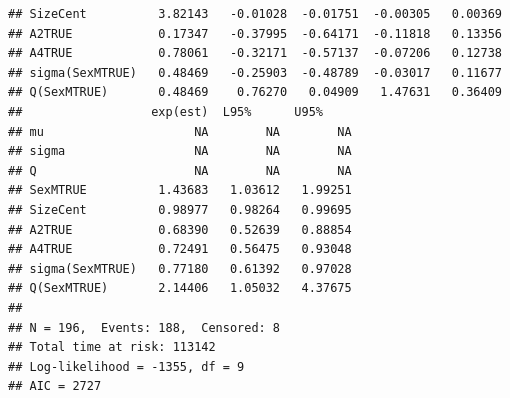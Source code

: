 \documentclass{article}\usepackage[]{graphicx}\usepackage[]{color}
\makeatletter
\newenvironment{kframe}{%
 \def\at@end@of@kframe{}%
 \ifinner\ifhmode%
  \def\at@end@of@kframe{\end{minipage}}%
  \begin{minipage}{\columnwidth}%
 \fi\fi%
 \def\FrameCommand##1{\hskip\@totalleftmargin \hskip-\fboxsep
 \colorbox{shadecolor}{##1}\hskip-\fboxsep
     \hskip-\linewidth \hskip-\@totalleftmargin \hskip\columnwidth}%
 \MakeFramed {\advance\hsize-\width
   \@totalleftmargin\z@ \linewidth\hsize
   \@setminipage}}%
 {\par\unskip\endMakeFramed%
 \at@end@of@kframe}
\newenvironment{knitrout}{}{} %
\makeatother
\begin{document}
\begin{knitrout}
\begin{kframe}
\begin{verbatim}
## SizeCent          3.82143   -0.01028  -0.01751  -0.00305   0.00369
## A2TRUE            0.17347   -0.37995  -0.64171  -0.11818   0.13356
## A4TRUE            0.78061   -0.32171  -0.57137  -0.07206   0.12738
## sigma(SexMTRUE)   0.48469   -0.25903  -0.48789  -0.03017   0.11677
## Q(SexMTRUE)       0.48469    0.76270   0.04909   1.47631   0.36409
##                  exp(est)  L95%      U95%    
## mu                     NA        NA        NA
## sigma                  NA        NA        NA
## Q                      NA        NA        NA
## SexMTRUE          1.43683   1.03612   1.99251
## SizeCent          0.98977   0.98264   0.99695
## A2TRUE            0.68390   0.52639   0.88854
## A4TRUE            0.72491   0.56475   0.93048
## sigma(SexMTRUE)   0.77180   0.61392   0.97028
## Q(SexMTRUE)       2.14406   1.05032   4.37675
## 
## N = 196,  Events: 188,  Censored: 8
## Total time at risk: 113142
## Log-likelihood = -1355, df = 9
## AIC = 2727
\end{verbatim}
\end{kframe}
\end{knitrout}
\end{document}
